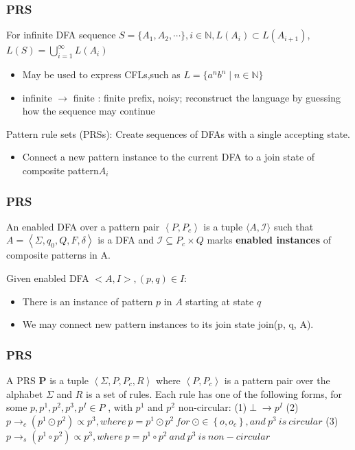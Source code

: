 \documentclass[aspectratio=169%
,serif,mathserif]{beamer}
\begin{document}
\begin{frame}
	\frametitle{PRS}
	For infinite DFA sequence $S = \{A_1,A_2,\cdots\}, i \in \mathbb{N},L(A_i) \subset L(A_{i+1})$,
	$L(S) = \bigcup\limits_{i = 1}^{\infty} L(A_i)$

	\begin{itemize}
		\item May be used to express CFLs,such as $L=\{{a}^{n}{b}^{n} \mid n \in \mathbb{N}\}$
		\item infinite $\to$ finite : finite prefix, noisy; reconstruct the language by guessing how the sequence may continue
	\end{itemize}

	Pattern rule sets (PRSs): Create sequences of DFAs with a single accepting state.

	\begin{itemize}
		\item Connect a new pattern instance to the current DFA to a join state of composite pattern$A_i$
	\end{itemize}
\end{frame}

\begin{frame}
	\frametitle{PRS}
	\begin{definition}
		An enabled DFA over a pattern pair  $\left\langle P, P_{c}\right\rangle$  
		is a tuple  $\langle A, \mathcal{I}\rangle$  such that  
		$A=\left\langle\Sigma, q_{0}, Q, F, \delta\right\rangle$  is a DFA and  
		$\mathcal{I} \subseteq P_{c} \times Q$  
		marks \textbf{enabled instances} of composite patterns in A.
	\end{definition}
	 
	Given enabled DFA $<A, I>, (p,q) \in I$:
	\begin{itemize}
		\item  There is an instance of pattern $p$ in $A$ starting at state $q$
		\item  We may connect new pattern instances to its join state join(p, q, A).
	\end{itemize}
\end{frame}

\begin{frame}
	\frametitle{PRS}
	\begin{definition}
		A PRS  $\mathbf{P}$  is a tuple $\left\langle\Sigma, P, P_{c}, R\right\rangle$  
		where  $\left\langle P, P_{c}\right\rangle$  is a pattern pair over the alphabet
		$\Sigma$  and $R$  is a set of rules. Each rule has one of the following forms, 
		for some  $p, p^{1}, p^{2}, p^{3}, p^{I} \in P$ , with $ p^{1}$  and  $p^{2}$  
		non-circular:
		(1)$\perp \rightarrow p^{I}$ 
		(2)$ p \rightarrow_{c}\left(p^{1} \odot p^{2}\right) \propto p^{3} , where~p=p^{1} \odot p^{2}~for~\odot \in\left\{o, o_{c}\right\} , and~p^{3}~is~circular$
		(3)$ p \rightarrow_{s}\left(p^{1} \circ p^{2}\right) \propto p^{3} , where~p=p^{1} \circ p^{2}~and~p^{3}~is~non-circular$
	\end{definition}
\end{frame}
\end{document}
